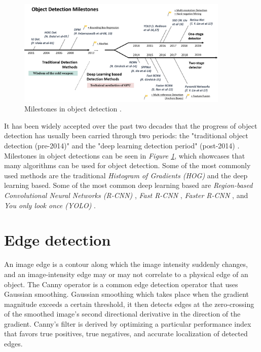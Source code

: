 \begin{figure}[h]
  \centering
  \includegraphics[width=0.9\textwidth]{graphics/objectdetection.png}
  \caption{Milestones in object detection \cite{zou_object_2019}.}
  \label{fig:milestones}
\end{figure}
It has been widely accepted over the past two decades that the progress of object detection has usually been carried through two periods: the "traditional object detection (pre-2014)" and the "deep learning detection period" (post-2014) \cite{zou_object_2019}. Milestones in object detections can be seen in \textit{Figure \ref{fig:milestones}}, which showcases that many algorithms can be used for object detection. 
Some of the most commonly used methods are the traditional \textit{Histogram of Gradients (HOG)} \cite{dalal_histograms_2005} and the deep learning based. Some of the most common deep learning based are \textit{Region-based Convolutional Neural Networks (R-CNN)} \cite{girshick_region-based_2016}, \textit{Fast R-CNN} \cite{girshick_fast_2015}, \textit{Faster R-CNN} \cite{ren_faster_2016}, and \textit{You only look once (YOLO)} \cite{redmon_you_2016}.


\section{Edge detection} 
An image edge is a contour along which the image intensity suddenly changes, and an image-intensity edge may or may not correlate to a physical edge of an object. The Canny operator \cite{nalwa_edge_1993} is a common edge detection operator that uses Gaussian smoothing. Gaussian smoothing which takes place when the gradient magnitude exceeds a certain threshold, it then detects edges at the zero-crossing of the smoothed image's second directional derivative in the direction of the gradient. Canny's filter is derived by optimizing a particular performance index that favors true positives, true negatives, and accurate localization of detected edges.

